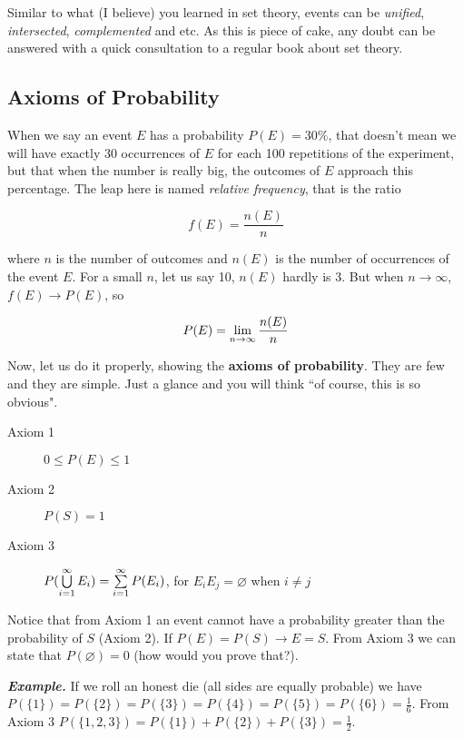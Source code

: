 \documentclass[a4paper,twocolumn]{article}
\begin{document}
Similar to what (I believe) you learned in set theory, events can be \textit{unified}, \textit{intersected}, \textit{complemented} and etc. As this is piece of cake, any doubt can be answered with a quick consultation to a regular book about set theory.


\subsection{Axioms of Probability}
\label{subsec:axioms}

When we say an event $E$ has a probability $P(E) = 30\%$, that doesn't mean we will have exactly 30 occurrences of $E$ for each 100 repetitions of the experiment, but that when the number is really big, the outcomes of $E$ approach this percentage. The leap here is named \textit{relative frequency}, that is the ratio

\begin{equation}
\label{eq:rel-freq}
f(E) = \frac{n(E)}{n}
\end{equation}

\noindent where $n$ is the number of outcomes and $n(E)$ is the number of occurrences of the event $E$. For a small $n$, let us say 10, $n(E)$ hardly is 3. But when $n \to \infty$, $f(E) \to P(E)$, so

\begin{equation}
\label{eq:probability}
P(E) = \lim\limits_{n \to \infty} \frac{n(E)}{n}
\end{equation}

Now, let us do it properly, showing the \textbf{axioms of probability}. They are few and they are simple. Just a glance and you will think ``of course, this is so obvious".

\begin{description}
    \item[Axiom 1] $0 \leq P(E) \leq 1$
    \item[Axiom 2] $P(S) = 1$
    \item[Axiom 3] $P(\bigcup\limits_{i=1}^{\infty} E_i) = \sum\limits_{i=1}^{\infty} P(E_i)$, for $E_iE_j = \varnothing$ when $i \neq j$
\end{description}

\noindent Notice that from Axiom 1 an event cannot have a probability greater than the probability of $S$ (Axiom 2). If $P(E) = P(S) \to E = S$. From Axiom 3 we can state that $P(\varnothing) = 0$ (how would you prove that?).

\bigskip

\noindent\textbf{\textit{Example.}} If we roll an honest die (all sides are equally probable) we have $P(\{1\}) = P(\{2\}) = P(\{3\}) = P(\{4\}) = P(\{5\}) = P(\{6\}) = \frac{1}{6}$. From Axiom 3 $P(\{1,2,3\}) = P(\{1\}) + P(\{2\}) + P(\{3\}) = \frac{1}{2}$.
\end{document}
